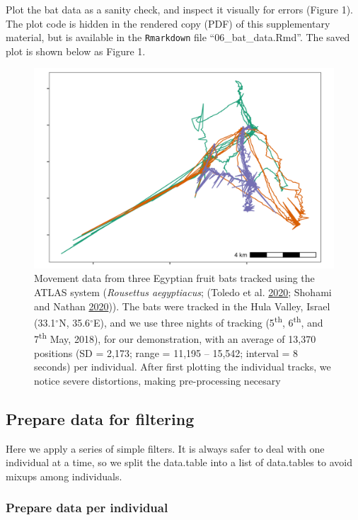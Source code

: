 \documentclass[]{scrartcl}
\begin{document}
Plot the bat data as a sanity check, and inspect it visually for errors (Figure 1).
The plot code is hidden in the rendered copy (PDF) of this supplementary material, but is available in the \texttt{Rmarkdown} file ``06\_bat\_data.Rmd''.
The saved plot is shown below as Figure 1.

\begin{figure}
\centering
\includegraphics{figures/fig_bat_raw.png}
\caption{Movement data from three Egyptian fruit bats tracked using the ATLAS system (\emph{Rousettus aegyptiacus}; (Toledo et al. \protect\hyperlink{ref-toledo2020}{2020}; Shohami and Nathan \protect\hyperlink{ref-shohami2020}{2020})).
The bats were tracked in the Hula Valley, Israel (33.1\(^{\circ}\)N, 35.6\(^{\circ}\)E), and we use three nights of tracking (5\textsuperscript{th}, 6\textsuperscript{th}, and 7\textsuperscript{th} May, 2018), for our demonstration, with an average of 13,370 positions (SD = 2,173; range = 11,195 -- 15,542; interval = 8 seconds) per individual.
After first plotting the individual tracks, we notice severe distortions, making pre-processing necesary}
\end{figure}

\hypertarget{prepare-data-for-filtering}{%
\subsection{Prepare data for filtering}\label{prepare-data-for-filtering}}

Here we apply a series of simple filters.
It is always safer to deal with one individual at a time, so we split the data.table
into a list of data.tables to avoid mixups among individuals.

\hypertarget{prepare-data-per-individual}{%
\subsubsection{Prepare data per individual}\label{prepare-data-per-individual}}
\end{document}
